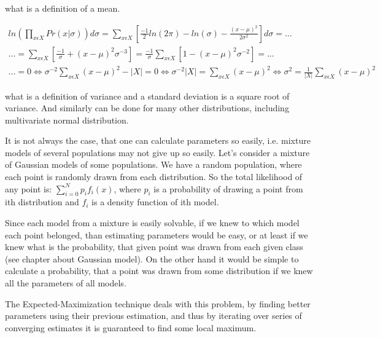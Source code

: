 \documentclass[12pt,a4paper,english]{article}
\begin{document}
what is a definition of a mean. \newline 

\begin{multline}
    ln(\prod_{x \epsilon X} Pr(x | \sigma))d\sigma = \sum_{x \epsilon X}[\frac {-1} 2 ln(2\pi)-ln(\sigma)- \frac {(x-\mu)^2} {2 \sigma^2} ]d\sigma = ... \\
    ...= \sum_{x \epsilon X}[\frac {-1} \sigma + (x-\mu)^2 \sigma^{-3}] = \frac {-1} {\sigma} \sum_{x \epsilon X}[1-(x-\mu)^2 \sigma^{-2}]=... \\
    ...= 0 \iff \sigma^{-2} \sum_{x \epsilon X}(x-\mu)^2 - | X |=0 \iff \sigma^{-2} | X | = \sum_{x \epsilon X}(x-\mu)^2 \iff \sigma^2 = \frac 1 {|X|} \sum_{x \epsilon X}(x-\mu)^2
\end{multline}

what is a definition of variance and a standard deviation is a square root of variance. \newline
And similarly can be done for many other distributions, including multivariate normal distribution. \newline

\newpage

It is not always the case, that one can calculate parameters so easily, i.e. mixture models of several populations may not give up so easily.
Let's consider a mixture of Gaussian models of some populations. We have a random population, where each point is randomly drawn from each distribution. 
So the total likelihood of any point is: $\sum_{i=0}^N p_i f_i(x)$, where $p_i$ is a probability of drawing a point from ith distribution and $f_i$ is a density function of ith model. \newline

Since each model from a mixture is easily solvable, if we knew to which model each point belonged, than estimating parameters would be easy,
or at least if we knew what is the probability, that given point was drawn from each given class (see chapter about Gaussian model). \newline
On the other hand it would be simple to calculate a probability, that a point was drawn from some distribution if we knew all the parameters of all models. \newline


The Expected-Maximization technique deals with this problem, by finding better parameters using their previous estimation, and thus by iterating over series of converging estimates it is guaranteed to find some local maximum. \newline
\end{document}
